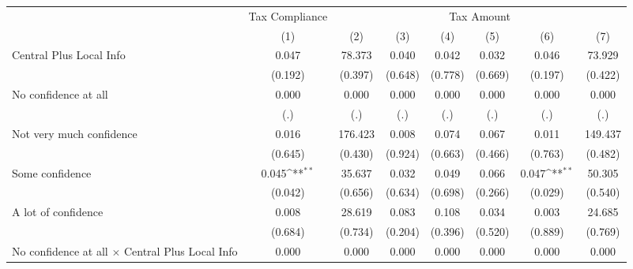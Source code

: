 {
\def\sym#1{\ifmmode^{#1}\else\(^{#1}\)\fi}
\begin{tabular}{l*{7}{c}}
\hline\hline
                &\multicolumn{1}{c}{Tax Compliance}&\multicolumn{6}{c}{Tax Amount}                                                                                   \\
                &\multicolumn{1}{c}{(1)}         &\multicolumn{1}{c}{(2)}         &\multicolumn{1}{c}{(3)}         &\multicolumn{1}{c}{(4)}         &\multicolumn{1}{c}{(5)}         &\multicolumn{1}{c}{(6)}         &\multicolumn{1}{c}{(7)}         \\
\hline
Central Plus Local Info&    0.047         &   78.373         &    0.040         &    0.042         &    0.032         &    0.046         &   73.929         \\
                &  (0.192)         &  (0.397)         &  (0.648)         &  (0.778)         &  (0.669)         &  (0.197)         &  (0.422)         \\
No confidence at all&    0.000         &    0.000         &    0.000         &    0.000         &    0.000         &    0.000         &    0.000         \\
                &      (.)         &      (.)         &      (.)         &      (.)         &      (.)         &      (.)         &      (.)         \\
Not very much confidence&    0.016         &  176.423         &    0.008         &    0.074         &    0.067         &    0.011         &  149.437         \\
                &  (0.645)         &  (0.430)         &  (0.924)         &  (0.663)         &  (0.466)         &  (0.763)         &  (0.482)         \\
Some confidence &    0.045\sym{**} &   35.637         &    0.032         &    0.049         &    0.066         &    0.047\sym{**} &   50.305         \\
                &  (0.042)         &  (0.656)         &  (0.634)         &  (0.698)         &  (0.266)         &  (0.029)         &  (0.540)         \\
A lot of confidence&    0.008         &   28.619         &    0.083         &    0.108         &    0.034         &    0.003         &   24.685         \\
                &  (0.684)         &  (0.734)         &  (0.204)         &  (0.396)         &  (0.520)         &  (0.889)         &  (0.769)         \\
No confidence at all $\times$ Central Plus Local Info&    0.000         &    0.000         &    0.000         &    0.000         &    0.000         &    0.000         &    0.000         \\

\end{tabular}}
